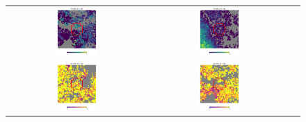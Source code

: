 \documentclass[preprintm,linenumbers]{aastex631}
\begin{document}
\begin{figure}
\begin{tabular}{  c c c}
				\includegraphics[width=0.3\textwidth]{results/skymaps_cutout/skymaps_cutout_first_year_one_snap_v4_0_10yrs_db_noDD_noTwi_tscale-14_nside-256_doAllTemplateMetrics_reduceCount_g_WFD_noDD_noTwi.pdf} &
				\includegraphics[width=0.3\textwidth]{results/skymaps_cutout/skymaps_cutout_first_year_one_snap_v4_0_10yrs_db_noDD_noTwi_tscale-14_nside-256_doAllTemplateMetrics_reduceCount_g_GP_noDD_noTwi.pdf} \\
				\includegraphics[width=0.3\textwidth]{results/skymaps_cutout/skymaps_cutout_delta_first_year_one_snap_v4_0_10yrs_db_noDD_noTwi_tscale-14_nside-256_doAllTemplateMetrics_reduceCount_g_NES_noDD_noTwi.pdf} &
				\includegraphics[width=0.3\textwidth]{results/skymaps_cutout/skymaps_cutout_delta_first_year_one_snap_v4_0_10yrs_db_noDD_noTwi_tscale-14_nside-256_doAllTemplateMetrics_reduceCount_g_WFD_noDD_noTwi.pdf} &

\end{tabular}
\end{figure}
\end{document}
